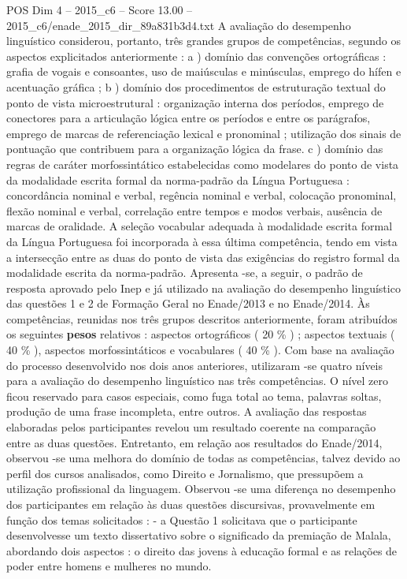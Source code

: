 \begin{textsample}{POS Dim 4 – 2015\_c6 – Score 13.00 – 2015\_c6/enade\_2015\_dir\_89a831b3d4.txt}
A avaliação do desempenho linguístico considerou, portanto, três grandes grupos de competências, segundo os aspectos explicitados anteriormente : a ) domínio das convenções ortográficas : grafia de vogais e consoantes, uso de maiúsculas e minúsculas, emprego do hífen e acentuação gráfica ; b ) domínio dos procedimentos de estruturação textual do ponto de vista microestrutural : organização interna dos períodos, emprego de conectores para a articulação lógica entre os períodos e entre os parágrafos, emprego de marcas de referenciação lexical e pronominal ; utilização dos sinais de pontuação que contribuem para a organização lógica da frase. c ) domínio das regras de caráter morfossintático estabelecidas como modelares do ponto de vista da modalidade escrita formal da norma-padrão da Língua Portuguesa : concordância nominal e verbal, regência nominal e verbal, colocação pronominal, flexão nominal e verbal, correlação entre tempos e modos verbais, ausência de marcas de oralidade.
A seleção vocabular adequada à modalidade escrita formal da Língua Portuguesa foi incorporada à essa última competência, tendo em vista a intersecção entre as duas do ponto de vista das exigências do registro formal da modalidade escrita da norma-padrão.
Apresenta -se, a seguir, o padrão de resposta aprovado pelo Inep e já utilizado na avaliação do desempenho linguístico das questões 1 e 2 de Formação Geral no Enade/2013 e no Enade/2014.
Às competências, reunidas nos três grupos descritos anteriormente, foram atribuídos os seguintes \textbf{pesos} relativos : aspectos ortográficos ( 20 \% ) ; aspectos textuais ( 40 \% ), aspectos morfossintáticos e vocabulares ( 40 \% ).
Com base na avaliação do processo desenvolvido nos dois anos anteriores, utilizaram -se quatro níveis para a avaliação do desempenho linguístico nas três competências.
O nível zero ficou reservado para casos especiais, como fuga total ao tema, palavras soltas, produção de uma frase incompleta, entre outros.
A avaliação das respostas elaboradas pelos participantes revelou um resultado coerente na comparação entre as duas questões.
Entretanto, em relação aos resultados do Enade/2014, observou -se uma melhora do domínio de todas as competências, talvez devido ao perfil dos cursos analisados, como Direito e Jornalismo, que pressupõem a utilização profissional da linguagem.
Observou -se uma diferença no desempenho dos participantes em relação às duas questões discursivas, provavelmente em função dos temas solicitados : - a Questão 1 solicitava que o participante desenvolvesse um texto dissertativo sobre o significado da premiação de Malala, abordando dois aspectos : o direito das jovens à educação formal e as relações de poder entre homens e mulheres no mundo.

\end{textsample}

